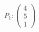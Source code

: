\documentclass[preview]{standalone}
\begin{document}
\begin{align*}
P_1:\begin{pmatrix}4 \\5 \\1\end{pmatrix}
\end{align*}
\end{document}
